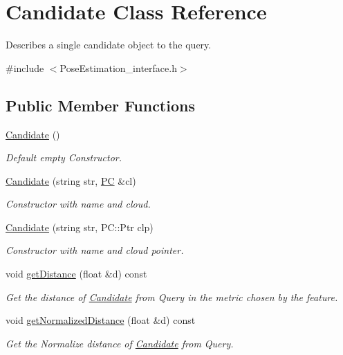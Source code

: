 \hypertarget{classCandidate}{\section{Candidate Class Reference}
\label{classCandidate}
}


Describes a single candidate object to the query.  




{\ttfamily \#include $<$Pose\-Estimation\-\_\-interface.\-h$>$}

\subsection*{Public Member Functions}
\begin{DoxyCompactItemize}
\item 
\hyperlink{classCandidate_aa2747741fb662af5e8f3d01d1d1a43b6}{Candidate} ()
\begin{DoxyCompactList}\small\item\em Default empty Constructor. \end{DoxyCompactList}\item 
\hyperlink{classCandidate_ab11f2b0e931e233a97331802dedcdae1}{Candidate} (string str, \hyperlink{group__Definitions_ga62eb21fcfa3189c5de50fb62a2a7a79e}{P\-C} \&cl)
\begin{DoxyCompactList}\small\item\em Constructor with name and cloud. \end{DoxyCompactList}\item 
\hyperlink{classCandidate_aa875b9c8439139764cf2216bf549abb2}{Candidate} (string str, P\-C\-::\-Ptr clp)
\begin{DoxyCompactList}\small\item\em Constructor with name and cloud pointer. \end{DoxyCompactList}\item 
void \hyperlink{classCandidate_a4424e1c6f6d8a739f5a0ea3b8721586f}{get\-Distance} (float \&d) const 
\begin{DoxyCompactList}\small\item\em Get the distance of \hyperlink{classCandidate}{Candidate} from Query in the metric chosen by the feature. \end{DoxyCompactList}\item 
void \hyperlink{classCandidate_aa68e39163876a510ff4b8687fdfed5bd}{get\-Normalized\-Distance} (float \&d) const 
\begin{DoxyCompactList}\small\item\em Get the Normalize distance of \hyperlink{classCandidate}{Candidate} from Query. \end{DoxyCompactList}\item 

\end{DoxyCompactItemize}
